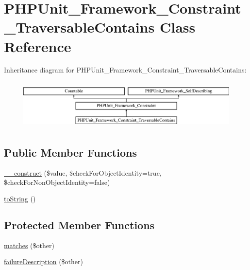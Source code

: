 \hypertarget{class_p_h_p_unit___framework___constraint___traversable_contains}{}\section{P\+H\+P\+Unit\+\_\+\+Framework\+\_\+\+Constraint\+\_\+\+Traversable\+Contains Class Reference}
\label{class_p_h_p_unit___framework___constraint___traversable_contains}
Inheritance diagram for P\+H\+P\+Unit\+\_\+\+Framework\+\_\+\+Constraint\+\_\+\+Traversable\+Contains\+:\begin{figure}[H]
\begin{center}
\leavevmode
\includegraphics[height=2.592592cm]{class_p_h_p_unit___framework___constraint___traversable_contains}
\end{center}
\end{figure}
\subsection*{Public Member Functions}
\begin{DoxyCompactItemize}
\item 
\mbox{\hyperlink{class_p_h_p_unit___framework___constraint___traversable_contains_ac7be096c59869e7105d2e4a321c78924}{\+\_\+\+\_\+construct}} (\$value, \$check\+For\+Object\+Identity=true, \$check\+For\+Non\+Object\+Identity=false)
\item 
\mbox{\hyperlink{class_p_h_p_unit___framework___constraint___traversable_contains_a5558c5d549f41597377fa1ea8a1cefa3}{to\+String}} ()
\end{DoxyCompactItemize}
\subsection*{Protected Member Functions}
\begin{DoxyCompactItemize}
\item 
\mbox{\hyperlink{class_p_h_p_unit___framework___constraint___traversable_contains_a9c9c337de483bbdbb9fa249a6c7c9cc5}{matches}} (\$other)
\item 
\mbox{\hyperlink{class_p_h_p_unit___framework___constraint___traversable_contains_aaabb679273bfb812df4d81c283754a59}{failure\+Description}} (\$other)
\end{DoxyCompactItemize}

